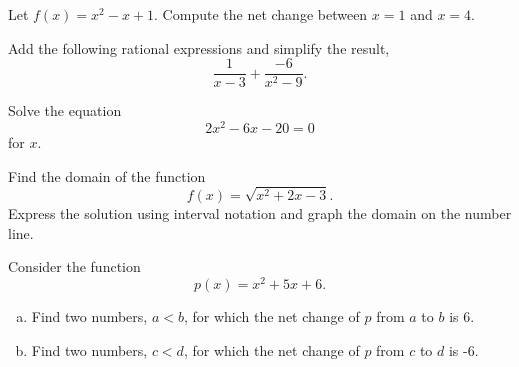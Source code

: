 \documentclass[12pt]{amsart}
\begin{document}
\begin{thm}[16 Points]\label{ex8}
  Let $f(x) = x^2 -x + 1$.  Compute the net change between $x = 1$ and $x = 4$.
\end{thm}

\newpage

\begin{thm}[16 Points]\label{ex9}
  Add the following rational expressions and simplify the result,
  $$\frac{1}{x - 3} + \frac{-6}{x^2-9}.$$
\end{thm}

\newpage

\begin{thm}[16 Points]\label{ex10}
  Solve the equation
  $$2x^2 - 6x - 20 = 0$$
  for $x$.
  \vspace{3in}
\end{thm}

\begin{thm}[16 Points]\label{ex11}
  Find the domain of the function
  $$f(x) = \sqrt{x^2 + 2x - 3}.$$
  Express the solution using interval notation and graph the domain on the number line.
\end{thm}

\newpage

\begin{thm}\label{bonus}
  Consider the function
  $$p(x) = x^2 + 5x + 6.$$
  \begin{enumerate}[(a)]
  \item
    Find two numbers, $a < b$, for which the net change of $p$ from $a$ to $b$ is 6.
    \vspace{4in}
  \item
    Find two numbers, $c < d$, for which the net change of $p$ from $c$ to $d$ is -6.
  \end{enumerate}
\end{thm}
\end{document}
